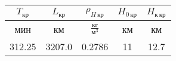 \begin{tabular}{|c|c|c|c|c|}
\hline
$T_{кр}$ & $L_{кр}$ & $\rho_{H\, кр}$ & $H_{0\, кр}$ & $H_{к\, кр}$ \\ 
\hline
мин & км & $\frac{кг}{м^3}$ & км & км \\ 
\hline
312.25 & 3207.0 & 0.2786 & 11 & 12.7 \\ 
\hline
\end{tabular}